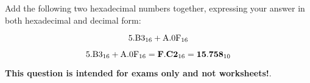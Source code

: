 

Add the following two hexadecimal numbers together, expressing your answer in both hexadecimal and decimal form:

$$\hbox{5.B3}_{16} + \hbox{A.0F}_{16}$$







$$\hbox{5.B3}_{16} + \hbox{A.0F}_{16} = {\bf F.C2}_{16} = {\bf 15.758}_{10}$$







{\bf This question is intended for exams only and not worksheets!}.




